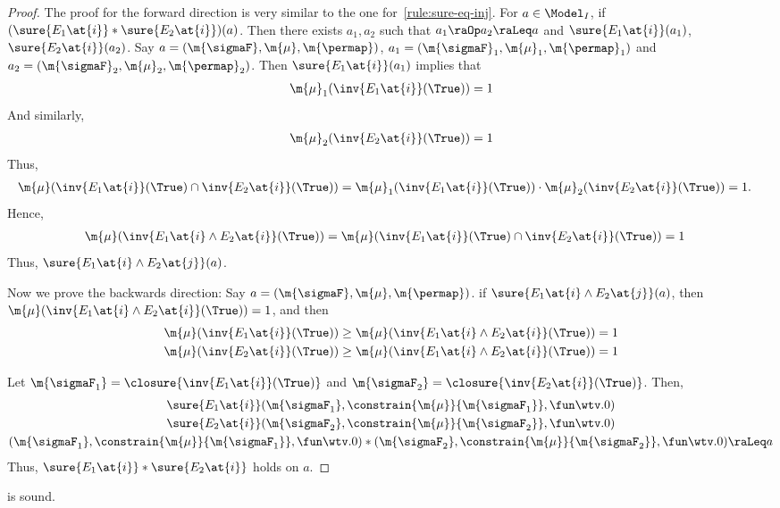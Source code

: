 \documentclass[acmsmall,nonacm,screen,appendix]{acmart}
\begin{document}
\begin{proof}
  The proof for the forward direction is very similar to
  the one for~\cref{rule:sure-eq-inj}.
  For $a \in \Model_I$,
  if $(\sure{E_1\at{i}} \ast \sure{E_2 \at{i}})(a)$.
  Then there exists
  $a_1, a_2$ such that $a_1 \raOp a_2 \raLeq a$ and
  $\sure{E_1 \at{i}}(a_1)$,
  $\sure{E_2 \at{i}}(a_2)$.
  Say $a = (\m{\sigmaF}, \m{\mu}, \m{\permap})$,
  $a_1 = (\m{\sigmaF}_1, \m{\mu}_1, \m{\permap}_1)$
  and $a_2 = (\m{\sigmaF}_2, \m{\mu}_2, \m{\permap}_2)$.
  Then $\sure{E_1\at{i}}(a_1)$ implies that
  \begin{align*}
    \m{\mu}_1 (\inv{E_1\at{i}}(\True)) = 1
  \end{align*}
  And similarly,
  \begin{align*}
    \m{\mu}_2 (\inv{E_2\at{i} }(\True)) = 1
  \end{align*}
  Thus,
  \begin{align*}
    \m{\mu} (\inv{E_1\at{i}}(\True) \cap \inv{E_2\at{i}}(\True) )
    &= \m{\mu}_1 (\inv{E_1\at{i}}(\True))  \cdot \m{\mu}_2 (\inv{E_2\at{i}}(\True))
     = 1.
  \end{align*}
  Hence,
  \begin{align*}
    \m{\mu} (\inv{E_1\at{i} \land E_2\at{i}}(\True) )
    &= \m{\mu} (\inv{E_1\at{i}}(\True) \cap \inv{E_2\at{i}}(\True)) = 1
  \end{align*}
  Thus, $\sure{E_1\at{i} \land E_2\at{j}} (a)$.

  Now we prove the backwards direction:
  Say $a = (\m{\sigmaF}, \m{\mu}, \m{\permap})$.
  if  $\sure{E_1\at{i} \land E_2\at{j}} (a)$,
  then $\m{\mu} (\inv{E_1\at{i} \land E_2\at{i}}(\True)) = 1$,
  and then
  \begin{align*}
    \m{\mu} (\inv{E_1\at{i}}(\True))  &\geq \m{\mu} (\inv{E_1\at{i} \land E_2\at{i}}(\True)) = 1 \\
    \m{\mu} (\inv{E_2\at{i}}(\True))  &\geq \m{\mu} (\inv{E_1\at{i} \land E_2\at{i}}(\True)) = 1
  \end{align*}

  Let $\m{\sigmaF_1} = \closure{\inv{E_1\at{i}}(\True)}$
  and $\m{\sigmaF_2} = \closure{\inv{E_2\at{i}}(\True)}$.
  Then,
  \begin{gather*}
    \sure{E_1\at{i}} (\m{\sigmaF_1}, \constrain{\m{\mu}}{\m{\sigmaF_1}}, \fun \wtv. 0) \\
    \sure{E_2\at{i}} (\m{\sigmaF_2}, \constrain{\m{\mu}}{\m{\sigmaF_2}}, \fun \wtv. 0) \\
    (\m{\sigmaF_1}, \constrain{\m{\mu}}{\m{\sigmaF_1}}, \fun \wtv. 0) \ast  (\m{\sigmaF_2}, \constrain{\m{\mu}}{\m{\sigmaF_2}}, \fun \wtv. 0) \raLeq a
  \end{gather*}
  Thus, $\sure{E_1\at{i}} \ast \sure{E_2\at{i}}$ holds on $a$.
\end{proof} \begin{lemma}
\label{proof:sure-and-star}
   is sound.
\end{lemma}
\end{document}
